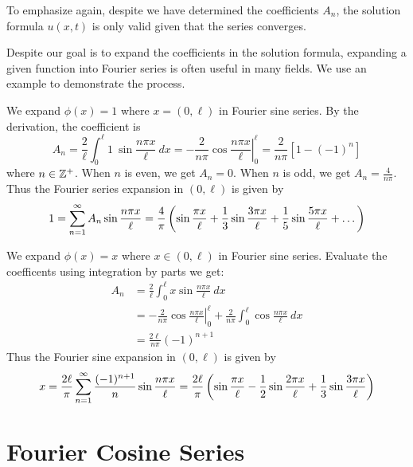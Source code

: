 \medskip

\begin{re} 
    To emphasize again, despite we have determined the coefficients $A_n$, the solution formula $u(x,t)$ is only valid given that the series converges.
\end{re}

Despite our goal is to expand the coefficients in the solution formula, expanding a given function into Fourier series is often useful in many fields. We use an example to demonstrate the process.

\medskip 

\begin{ex}
    We expand $\phi(x)=1$ where $x=(0,\ell)$ in Fourier sine series. By the derivation, the coefficient is 
    \[A_n = \frac{2}{\ell} \int_0^\ell 1\ \sin\frac{n\pi x}{\ell}\ dx = -\frac{2}{n\pi}\cos \left . \frac{n\pi x}{\ell}\right \vert^\ell_0 = \frac{2}{n\pi}[1 - (-1)^n]\]
    where $n\in{\mathbb Z}^+$. When $n$ is even, we get $A_n=0$. When $n$ is odd, we get $A_n = \frac{4}{n\pi}$. Thus the Fourier series expansion in $(0,\ell)$ is given by
    \[1 = \sum_{n=1}^\infty A_n \sin\frac{n\pi x}{\ell} = \frac{4}{\pi}\left(\sin\frac{\pi x}{\ell} + \frac{1}{3} \sin\frac{3\pi x}{\ell} + \frac{1}{5} \sin\frac{5\pi x}{\ell} + \dots\right)\]
\end{ex}

\medskip 

\begin{ex}
    We expand $\phi(x)=x$ where $x\in(0,\ell)$ in Fourier sine series. Evaluate the coefficents using integration by parts we get:
    \begin{align*}
        A_n &= \frac{2}{\ell}\int_0^\ell x\sin\frac{n\pi x}{\ell}\ dx\\
        &= \left . -\frac{2}{n\pi}\cos \frac{n\pi x}{\ell} \right \vert_0 ^\ell + \frac{2}{n\pi} \int_0^\ell \cos \frac{n\pi x}{\ell}\ dx\\
        &= \frac{2\ell}{n\pi} (-1)^{n+1}
    \end{align*}
    Thus the Fourier sine expansion in $(0,\ell)$ is given by 
    \[x = \frac{2\ell}{\pi} \sum_{n=1}^\infty \frac{(-1)^{n+1}}{n}\sin\frac{n\pi x}{\ell} = \frac{2\ell}{\pi}\left(\sin\frac{\pi x}{\ell} - \frac{1}{2}\sin\frac{2\pi x}{\ell} + \frac{1}{3}\sin\frac{3\pi x}{\ell}\right)\]
\end{ex}

\section{Fourier Cosine Series}


